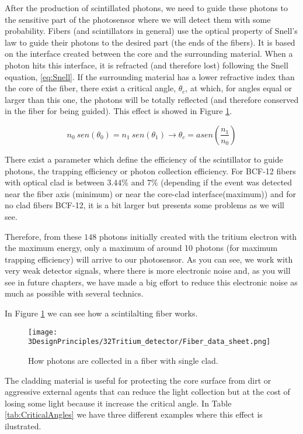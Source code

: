 After the production of scintillated photons, we need to guide these photons to the sensitive part of the photosensor where we will detect them with some probability. Fibers (and scintillators in general) use the optical property of Snell's law \cite{Snell} to guide their photons to the desired part (the ends of the fibers). It is based on the interface created between the core and the surrounding material. When a photon hits this interface, it is refracted (and therefore lost) following the Snell equation, \ref{eq:Snell}. If the surrounding material has a lower refractive index than the core of the fiber, there exist a critical angle, $\theta_c$, at which, for angles equal or larger than this one, the photons will be totally reflected (and therefore conserved in the fiber for being guided). This effect is showed in Figure \ref{fig:Fiber_physic}.

\begin{equation}
n_0~sen(\theta_0) = n_1~sen(\theta_1) \longrightarrow \theta_c = asen\left(\frac{n_1}{n_0} \right)
\label{eq:Snell}
\end{equation}

There exist a parameter which define the efficiency of the scintillator to guide photons, the trapping efficiency or photon collection efficiency. For BCF-12 fibers with optical clad is between $3.44\%$ and $7\%$ (depending if the event was detected near the fiber axis (minimum) or near the core-clad interface(maximum)) and for no clad fibers BCF-12, it is a bit larger but presents some problems as we will see.

Therefore, from these $148$ photons initially created with the tritium electron with the maximum energy, only a maximum of around 10 photons (for maximum trapping efficiency) will arrive to our photosensor. As you can see, we work with very weak detector signals, where there is more electronic noise and, as you will see in future chapters, we have made a big effort to reduce this electronic noise as much as possible with several technics.

In Figure \ref{fig:Fiber_physic} we can see how a scintilalting fiber works.

\begin{figure}[htbp]
\centering
\texttt{[image: 3DesignPrinciples/32Tritium\_detector/Fiber\_data\_sheet.png]}
\caption{How photons are collected in a fiber with single clad.\label{fig:Fiber_physic}~\cite{DataSheetBCF12Fiber}}
\end{figure}

The cladding material is useful for protecting the core surface from dirt or aggressive external agents that can reduce the light collection but at the cost of losing some light because it increase the critical angle. In Table \ref{tab:CriticalAngles} we have three different examples where this effect is ilustrated.


